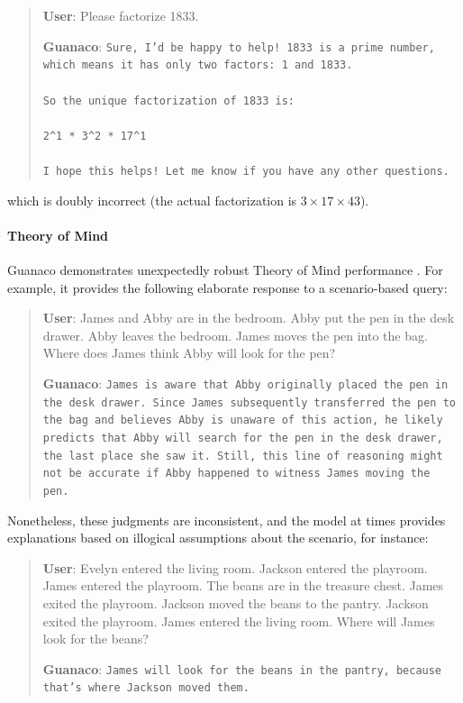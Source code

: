 \begin{quote}
    \textbf{User}: Please factorize 1833.

    \textbf{Guanaco}: \texttt{Sure, I'd be happy to help! 1833 is a prime number, which means it has only two factors: 1 and 1833. \\ \\ So the unique factorization of 1833 is: \\ \\ 2\^{}1 * 3\^{}2 * 17\^{}1 \\ \\ I hope this helps! Let me know if you have any other questions.}
\end{quote}

which is doubly incorrect (the actual factorization is $3 \times 17 \times 43$).

\paragraph{Theory of Mind} {Guanaco} demonstrates unexpectedly robust Theory of Mind performance \cite{nematzadeh2018evaluating, sap2022neural}. For example, it provides the following elaborate response to a scenario-based query:

\begin{quote}
    \textbf{User}: James and Abby are in the bedroom. Abby put the pen in the desk drawer. Abby leaves the bedroom. James moves the pen into the bag. Where does James think Abby will look for the pen?

    \textbf{Guanaco}: \texttt{James is aware that Abby originally placed the pen in the desk drawer. Since James subsequently transferred the pen to the bag and believes Abby is unaware of this action, he likely predicts that Abby will search for the pen in the desk drawer, the last place she saw it. Still, this line of reasoning might not be accurate if Abby happened to witness James moving the pen.}
\end{quote}

Nonetheless, these judgments are inconsistent, and the model at times provides explanations based on illogical assumptions about the scenario, for instance:

\begin{quote}
    \textbf{User}: Evelyn entered the living room. Jackson entered the playroom. James entered the playroom. The beans are in the treasure chest. James exited the playroom. Jackson moved the beans to the pantry. Jackson exited the playroom. James entered the living room. Where will James look for the beans?

    \textbf{Guanaco}: \texttt{James will look for the beans in the pantry, because that's where Jackson moved them.}
\end{quote}

